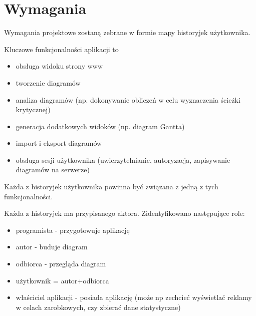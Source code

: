 \section{Wymagania}
Wymagania projektowe zostaną zebrane w formie mapy historyjek użytkownika.

Kluczowe funkcjonalności aplikacji to
\begin{itemize}
	\item obsługa widoku strony www
	\item tworzenie diagramów
	\item analiza diagramów (np. dokonywanie obliczeń w celu wyznaczenia ścieżki krytycznej)
	\item generacja dodatkowych widoków (np. diagram Gantta)
	\item import i eksport diagramów
	\item obsługa sesji użytkownika (uwierzytelnianie, autoryzacja, zapisywanie diagramów na serwerze)
\end{itemize}
	
Każda z historyjek użytkownika powinna być związana z jedną z tych funkcjonalności. 

Każda z historyjek ma przypisanego aktora. Zidentyfikowano następujące role:
\begin{itemize}
	\item programista - przygotowuje aplikację
	\item autor - buduje diagram
	\item odbiorca - przegląda diagram
	\item użytkownik = autor+odbiorca
	\item właściciel aplikacji - posiada aplikację (może np zechcieć wyświetlać reklamy w celach zarobkowych, czy zbierać dane statystyczne) 
\end{itemize}


